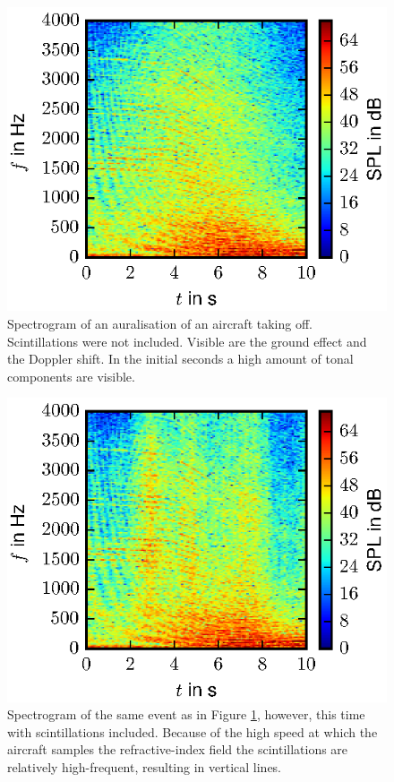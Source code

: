 \begin{figure}[H]
  \centering
  \includegraphics[]{../figures/manual/turbulence-model/auralisation_flight_without}
  \caption{Spectrogram of an auralisation of an aircraft taking off.
Scintillations were not included. Visible are the ground effect and the Doppler
shift. In the initial seconds a high amount of tonal components are visible.
  }
  \label{fig:results_auralization_without}
\end{figure}

\begin{figure}[H]
  \centering
  \includegraphics[]{../figures/manual/turbulence-model/auralisation_flight_both}
  \caption{Spectrogram of the same event as in Figure
  \ref{fig:results_auralization_without}, however, this time with scintillations included. Because of the high speed at which the aircraft samples the refractive-index field the scintillations are relatively high-frequent, resulting in vertical lines.}
  \label{fig:results_auralization_with}
\end{figure}

